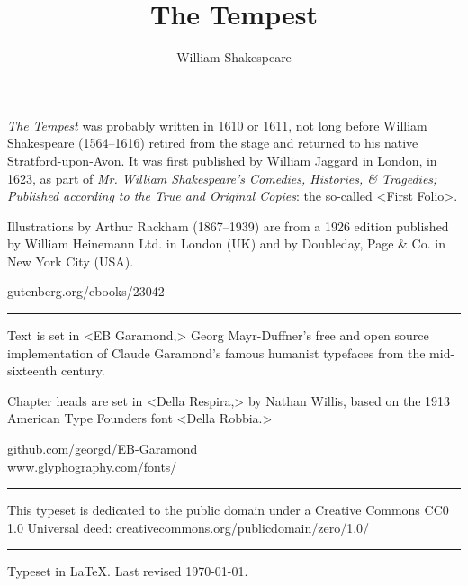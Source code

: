 \documentclass[
font=12pt,
a5paper,
]{scrbook} %
\title{The Tempest}
\author{William Shakespeare}
\begin{document}
\frontmatter
\begin{pictures}
	
	
\end{pictures}
\tableofcontents

\mainmatter
{}












\renewcommand\raggedsection{\centering} 
\vspace*{8em}
\centering

\begin{minipage}{\textwidth}
\textit{The Tempest} was probably written in 1610 or 1611, not long before William Shakespeare (1564--1616) retired from the stage and returned to his native Stratford-upon-Avon. It was first published by William Jaggard in London, in 1623, as part of \textit{Mr. William Shakespeare's Comedies, Histories, \& Tragedies; Published according to the True and Original Copies}: the so-called <First Folio>.

Illustrations by Arthur Rackham (1867--1939) are from a 1926 edition published by William Heinemann Ltd. in London (UK) and by Doubleday, Page \& Co. in New York City (USA). 
\end{minipage}
\vfill
gutenberg.org/ebooks/23042
\vfill
\rule{0.5\textwidth}{.4pt}
\vfill
\begin{minipage}{\textwidth}
Text is set in <EB Garamond,> Georg Mayr-Duffner's free and open source implementation of Claude Garamond’s famous humanist typefaces from the mid-sixteenth century. 

Chapter heads are set in <Della Respira,> by Nathan Willis, based on the 1913 American Type Founders font <Della Robbia.>
\end{minipage}
\vfill
github.com/georgd/EB-Garamond\\www.glyphography.com/fonts/
\vfill
\rule{0.5\textwidth}{.4pt}
\vfill
\begin{minipage}{\textwidth}
This typeset is dedicated to the public domain under a Creative Commons CC0 1.0 Universal deed: creativecommons.org/publicdomain/zero/1.0/\\
\end{minipage}
\vfill
\rule{0.5\textwidth}{.4pt}
\vfill
Typeset in \LaTeX{}. Last revised \today.
\vfill
\thispagestyle{empty}
\end{document}
